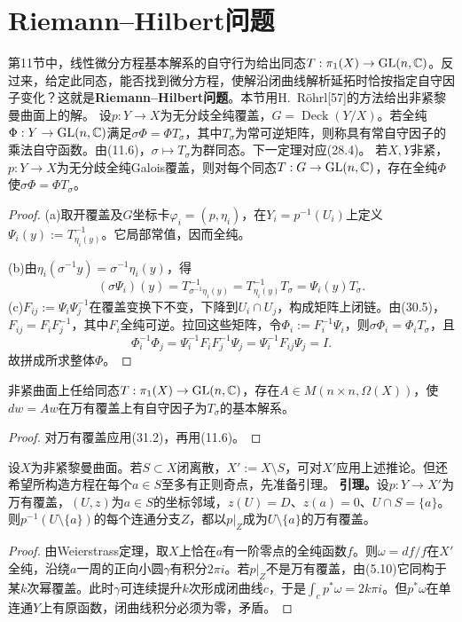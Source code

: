 \section{Riemann--Hilbert问题}
第11节中，线性微分方程基本解系的自守行为给出同态$T:\pi_1(X)\to\operatorname{GL}(n,\mathbb C)$。反过来，给定此同态，能否找到微分方程，使解沿闭曲线解析延拓时恰按指定自守因子变化？这就是\textbf{Riemann--Hilbert问题}。本节用H.~Röhrl[57]的方法给出非紧黎曼曲面上的解。
设$p:Y\to X$为无分歧全纯覆盖，$G=\operatorname{Deck}(Y/X)$。若全纯$\Phi:Y\to\operatorname{GL}(n,\mathbb C)$满足$\sigma\Phi=\Phi T_\sigma$，其中$T_\sigma$为常可逆矩阵，则称具有常自守因子的乘法自守函数。由(11.6)，$\sigma\mapsto T_\sigma$为群同态。下一定理对应(28.4)。
若$X,Y$非紧，$p:Y\to X$为无分歧全纯Galois覆盖，则对每个同态$T:G\to\operatorname{GL}(n,\mathbb C)$，存在全纯$\Phi$使$\sigma\Phi=\Phi T_\sigma$。
\begin{proof}
(a)取开覆盖及$G$坐标卡$\varphi_i=(p,\eta_i)$，在$Y_i=p^{-1}(U_i)$上定义$\Psi_i(y):=T_{\eta_i(y)}^{-1}$。它局部常值，因而全纯。

(b)由$\eta_i(\sigma^{-1}y)=\sigma^{-1}\eta_i(y)$，得
\[
(\sigma\Psi_i)(y)=T_{\sigma^{-1}\eta_i(y)}^{-1}=T_{\eta_i(y)}^{-1}T_\sigma=\Psi_i(y)T_\sigma.
\]
(c)$F_{ij}:=\Psi_i\Psi_j^{-1}$在覆盖变换下不变，下降到$U_i\cap U_j$，构成矩阵上闭链。由(30.5)，$F_{ij}=F_iF_j^{-1}$，其中$F_i$全纯可逆。拉回这些矩阵，令$\Phi_i:=F_i^{-1}\Psi_i$，则$\sigma\Phi_i=\Phi_iT_\sigma$，且
\[
\Phi_i^{-1}\Phi_j=\Psi_i^{-1}F_iF_j^{-1}\Psi_j=\Psi_i^{-1}F_{ij}\Psi_j=I.
\]
故拼成所求整体$\Phi$。
\end{proof}
非紧曲面上任给同态$T:\pi_1(X)\to\operatorname{GL}(n,\mathbb C)$，存在$A\in M(n\times n,\Omega(X))$，使$dw=Aw$在万有覆盖上有自守因子为$T_\sigma$的基本解系。
\begin{proof}
对万有覆盖应用(31.2)，再用(11.6)。
\end{proof}
设$X$为非紧黎曼曲面。若$S\subset X$闭离散，$X':=X\setminus S$，可对$X'$应用上述推论。但还希望所构造方程在每个$a\in S$至多有正则奇点，先准备引理。
\textbf{引理。}设$p:Y\to X'$为万有覆盖，$(U,z)$为$a\in S$的坐标邻域，$z(U)=D$、$z(a)=0$、$U\cap S=\{a\}$。则$p^{-1}(U\setminus\{a\})$的每个连通分支$Z$，都以$p|_Z$成为$U\setminus\{a\}$的万有覆盖。
\begin{proof}
由Weierstrass定理，取$X$上恰在$a$有一阶零点的全纯函数$f$。则$\omega=df/f$在$X'$全纯，沿绕$a$一周的正向小圆$\gamma$有积分$2\pi i$。若$p|_Z$不是万有覆盖，由(5.10)它同构于某$k$次幂覆盖。此时$\gamma$可连续提升$k$次形成闭曲线$c$，于是$\int_c p^*\omega=2k\pi i$。但$p^*\omega$在单连通$Y$上有原函数，闭曲线积分必须为零，矛盾。
\end{proof}
